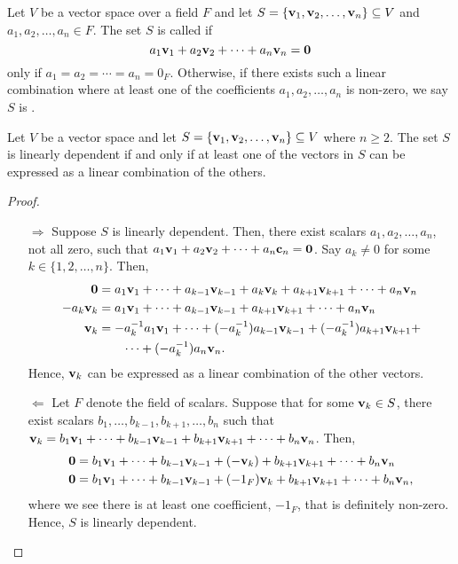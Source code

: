\begin{definition}
Let $ V $ be a vector space over a field $ F $ and let $ S=\{\mathbf{v}_1,\mathbf{v}_2,\ldots,\mathbf{v}_n\}\subseteq V $ and $ a_1,a_2,\ldots,a_n\in F $. The set $ S $ is called  if
\begin{equation*}
    a_1\mathbf{v}_1+a_2\mathbf{v}_2+\cdots+a_n\mathbf{v}_n=\mathbf{0}
\end{equation*}
only if $ a_1=a_2=\cdots=a_n=0_F $. Otherwise, if there exists such a linear combination where at least one of the coefficients $ a_1,a_2,\ldots,a_n $ is non-zero, we say $ S $ is .
\end{definition}

\begin{theorem}
Let $ V $ be a vector space and let $ S=\{\mathbf{v}_1,\mathbf{v}_2,\ldots,\mathbf{v}_n\}\subseteq V $ where $ n\geq 2 $. The set $ S $ is linearly dependent if and only if at least one of the vectors in $ S $ can be expressed as a linear combination of the others.
\end{theorem}
\begin{proof}~
\begin{enumerate}
    \item[$ \Rightarrow $] Suppose $ S $ is linearly dependent. Then, there exist scalars $ a_1,a_2,\ldots,a_n $, not all zero, such that $ a_1\mathbf{v}_1+a_2\mathbf{v}_2+\cdots+a_n\mathbf{c}_n=\mathbf{0} $. Say $ a_k\neq 0 $ for some $ k\in\{1,2,\ldots,n\} $. Then,
    \begin{align*}
        \mathbf{0} &= a_1\mathbf{v}_1+\cdots+a_{k-1}\mathbf{v}_{k-1}+a_k\mathbf{v}_k+a_{k+1}\mathbf{v}_{k+1}+\cdots+a_n\mathbf{v}_n \\
        -a_k\mathbf{v}_k &= a_1\mathbf{v}_1+\cdots+a_{k-1}\mathbf{v}_{k-1}+a_{k+1}\mathbf{v}_{k+1}+\cdots+a_n\mathbf{v}_n \\
        \mathbf{v}_k &= -a_k^{-1}a_1\mathbf{v}_1+\cdots+(-a_k^{-1})a_{k-1}\mathbf{v}_{k-1}+(-a_k^{-1})a_{k+1}\mathbf{v}_{k+1}+ \\
        &\qquad \cdots+(-a_k^{-1})a_n\mathbf{v}_n.
    \end{align*}
    Hence, $ \mathbf{v}_k $ can be expressed as a linear combination of the other vectors.

    \item[$ \Leftarrow $] Let $ F $ denote the field of scalars. Suppose that for some $ \mathbf{v}_k\in S $, there exist scalars $ b_1,\ldots,b_{k-1},b_{k+1},\ldots,b_n $ such that $ \mathbf{v}_k=b_1\mathbf{v}_1+\cdots+b_{k-1}\mathbf{v}_{k-1}+b_{k+1}\mathbf{v}_{k+1}+\cdots+b_n\mathbf{v}_n $. Then,
    \begin{align*}
        \mathbf{0} &= b_1\mathbf{v}_1+\cdots+b_{k-1}\mathbf{v}_{k-1}+(-\mathbf{v}_k)+b_{k+1}\mathbf{v}_{k+1}+\cdots+b_n\mathbf{v}_n \\
        \mathbf{0} &= b_1\mathbf{v}_1+\cdots+b_{k-1}\mathbf{v}_{k-1}+(-1_F)\mathbf{v}_k+b_{k+1}\mathbf{v}_{k+1}+\cdots+b_n\mathbf{v}_n,
    \end{align*}
    where we see there is at least one coefficient, $ -1_F $, that is definitely non-zero. Hence, $ S $ is linearly dependent.\qedhere
\end{enumerate}
\end{proof}

